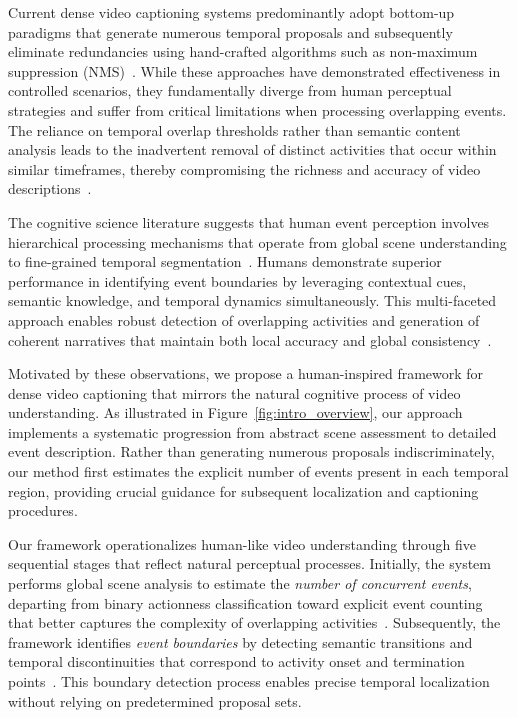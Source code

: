 Current dense video captioning systems predominantly adopt bottom-up paradigms that generate numerous temporal proposals and subsequently eliminate redundancies using hand-crafted algorithms such as non-maximum suppression (NMS)~\cite{Krishna2017-pw,Li2018-ll,Wang2018-ap,Zhou2018-zu}. While these approaches have demonstrated effectiveness in controlled scenarios, they fundamentally diverge from human perceptual strategies and suffer from critical limitations when processing overlapping events. The reliance on temporal overlap thresholds rather than semantic content analysis leads to the inadvertent removal of distinct activities that occur within similar timeframes, thereby compromising the richness and accuracy of video descriptions~\cite{Mun2019-ap,fujita2020soda}.

The cognitive science literature suggests that human event perception involves hierarchical processing mechanisms that operate from global scene understanding to fine-grained temporal segmentation~\cite{zacks2007event,kurby2008segmentation}. Humans demonstrate superior performance in identifying event boundaries by leveraging contextual cues, semantic knowledge, and temporal dynamics simultaneously. This multi-faceted approach enables robust detection of overlapping activities and generation of coherent narratives that maintain both local accuracy and global consistency~\cite{radvansky2006event,speer2007reading}.

Motivated by these observations, we propose a human-inspired framework for dense video captioning that mirrors the natural cognitive process of video understanding. As illustrated in Figure~\ref{fig:intro_overview}, our approach implements a systematic progression from abstract scene assessment to detailed event description. Rather than generating numerous proposals indiscriminately, our method first estimates the explicit number of events present in each temporal region, providing crucial guidance for subsequent localization and captioning procedures.

Our framework operationalizes human-like video understanding through five sequential stages that reflect natural perceptual processes. Initially, the system performs global scene analysis to estimate the \textit{number of concurrent events}, departing from binary actionness classification toward explicit event counting that better captures the complexity of overlapping activities~\cite{yuan2017temporal,lin2018bsn}. Subsequently, the framework identifies \textit{event boundaries} by detecting semantic transitions and temporal discontinuities that correspond to activity onset and termination points~\cite{long2019gaussian,zhao2020bottom}. This boundary detection process enables precise temporal localization without relying on predetermined proposal sets.

